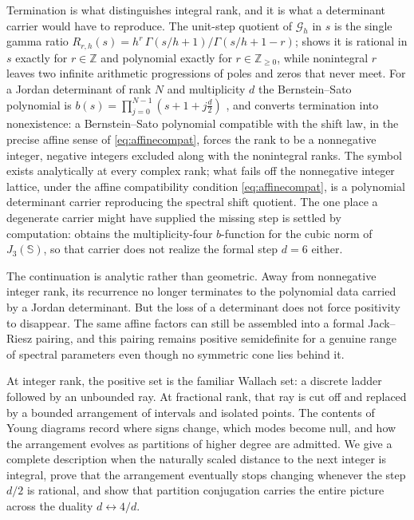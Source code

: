 \documentclass[11pt,letterpaper]{article}
\newcommand{\Gc}{\mathcal{G}}               %
\newcommand{\Zint}{\mathbb{Z}}
\newcommand{\Rm}{R}                          %
\begin{document}
Termination is what distinguishes integral rank, and it is what a determinant
carrier would have to reproduce. The unit-step quotient of $\Gc_h$ in $s$ is the
single gamma ratio $\Rm_{r,h}(s)=h^r\,\Gamma(s/h+1)/\Gamma(s/h+1-r)$;
 shows it is rational in $s$ exactly for $r\in\Zint$ and polynomial
exactly for $r\in\Zint_{\ge0}$, while nonintegral $r$ leaves two infinite
arithmetic progressions of poles and zeros that never meet. For a Jordan
determinant of rank $N$ and multiplicity $d$ the Bernstein--Sato polynomial is
$b(s)=\prod_{j=0}^{N-1}(s+1+j\tfrac{d}{2})$ \cite{FK,Kimura}, and
 converts termination into nonexistence: a Bernstein--Sato
polynomial compatible with the shift law, in the precise affine sense of
\eqref{eq:affinecompat}, forces the rank to be a nonnegative integer, negative
integers excluded along with the nonintegral ranks. The symbol exists analytically
at every complex rank; what fails off the nonnegative integer lattice, under the
affine compatibility condition \eqref{eq:affinecompat}, is a polynomial
determinant carrier reproducing the spectral shift quotient. The one place a
degenerate carrier might have supplied the missing step is settled by computation:
 obtains the multiplicity-four $b$-function for the cubic
norm of $J_3(\mathbb{S})$, so that carrier does not realize the formal step $d=6$
either.

The continuation is analytic rather than geometric. Away from nonnegative integer
rank, its recurrence no longer terminates to the polynomial data carried by a
Jordan determinant. But the loss of a determinant does not force positivity to
disappear. The same affine factors can still be assembled into a formal
Jack--Riesz pairing, and this pairing remains positive semidefinite for a genuine
range of spectral parameters even though no symmetric cone lies behind it.

At integer rank, the positive set is the familiar Wallach set: a discrete ladder
followed by an unbounded ray. At fractional rank, that ray is cut off and replaced
by a bounded arrangement of intervals and isolated points. The contents of Young
diagrams record where signs change, which modes become null, and how the
arrangement evolves as partitions of higher degree are admitted. We give a
complete description when the naturally scaled distance to the next integer is
integral, prove that the arrangement eventually stops changing whenever the step
$d/2$ is rational, and show that partition conjugation carries the entire picture
across the duality $d\leftrightarrow 4/d$.
\end{document}
